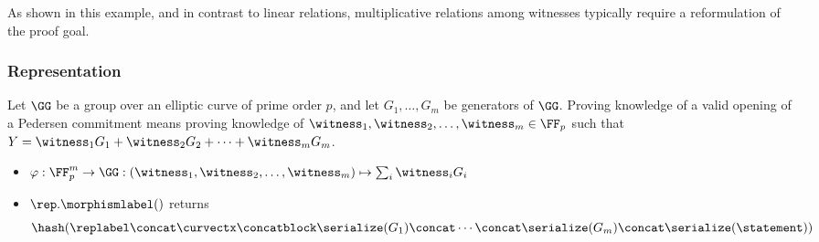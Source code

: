 \documentclass[11pt]{article}
\begin{document}
As shown in this example, and in contrast to linear relations, multiplicative relations among witnesses typically require a reformulation of the proof goal.


\subsubsection{Representation}\label{sec:instantiations:representation}
Let $\GG$ be a group over an elliptic curve of prime order $p$, and let $G_1, \dots, G_m$ be generators of $\GG$.
Proving knowledge of a valid opening of a Pedersen commitment means proving knowledge of $\witness_1,\witness_2, \dots, \witness_m\in\FF_p$ such that $Y=\witness_1G_1 + \witness_2G_2 + \dots + \witness_m G_m$.


\begin{itemize}
  \item $\varphi:\FF_p^m\to\GG:(\witness_1,\witness_2, \dots, \witness_m)\mapsto \sum_i \witness_iG_i$
  \item $\rep.\morphismlabel()$ returns
  \[
    \hash(\replabel \concat \curvectx \concatblock \serialize(G_1) \concat \cdots \concat \serialize(G_m) \concat \serialize(\statement))
  \]
\end{itemize}
\end{document}
